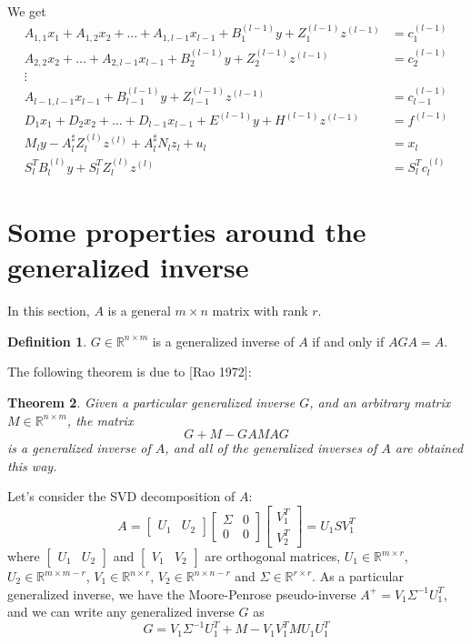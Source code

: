 \documentclass[]{article}
\newtheorem{theorem}{Theorem}[section]
\theoremstyle{definition}
\newtheorem{definition}[theorem]{Definition}
\newcommand{\BIN}{\begin{bmatrix}}
\newcommand{\BOUT}{\end{bmatrix}}
\begin{document}
We get
\begin{align}
A_{1,1} x_1 + A_{1,2} x_2 + \ldots + A_{1,l-1} x_{l-1} + B_1^{(l-1)} y + Z_1^{(l-1)} z^{(l-1)}&= c_1^{(l-1)}  \label{eq:triang_1f}\\
A_{2,2} x_2 + \ldots + A_{2,l-1} x_{l-1} + B_2^{(l-1)} y + Z_2^{(l-1)} z^{(l-1)}&= c_2^{(l-1)}\\
\vdots& \nonumber\\
A_{l-1,l-1} x_{l-1} + B_{l-1}^{(l-1)} y + Z_{l-1}^{(l-1)} z^{(l-1)}&= c_{l-1}^{(l-1)}\\
D_1 x_1 + D_2 x_2 + \ldots + D_{l-1} x_{l-1} + E^{(l-1)} y + H^{(l-1)} z^{(l-1)}&= f^{(l-1)} \label{eq:other_s}\\
M_l y -A_l^\sharp Z_l^{(l)} z^{(l)} + A_l^\sharp N_l z_l + u_l &= x_l\\
	S_l^T B_l^{(l)} y + S_l^T Z_l^{(l)} z^{(l)} &= S_l^T c_l^{(l)}
\end{align}

\appendix
\section{Some properties around the generalized inverse}
In this section, $A$ is a general $m \times n$ matrix with rank $r$.

\begin{definition}
  $G \in \mathbb{R}^{n \times m}$ is a generalized inverse of $A$ if and only if $A G A = A$.
\end{definition}
The following theorem is due to [Rao 1972]:
\begin{theorem}
  Given a particular generalized inverse $G$, and an arbitrary matrix $M\in \mathbb{R}^{n \times m}$, the matrix
	\begin{equation}
		G + M - GAMAG
	\end{equation}
	is a generalized inverse of $A$, and all of the generalized inverses of $A$ are obtained this way.
\end{theorem}

Let's consider the SVD decomposition of $A$:
\begin{equation*}
  A = \BIN U_1 & U_2 \BOUT \BIN \Sigma & 0 \\ 0 & 0 \BOUT \BIN V_1^T \\ V_2^T \BOUT = U_1 S V_1^T
\end{equation*}
where $\BIN U_1 & U_2 \BOUT$ and $\BIN V_1 & V_2 \BOUT$ are orthogonal matrices, $U_1 \in \mathbb{R}^{m \times r}$, $U_2 \in \mathbb{R}^{m \times m-r}$, $V_1 \in \mathbb{R}^{n \times r}$, $V_2 \in \mathbb{R}^{n \times n-r}$ and $\Sigma \in \mathbb{R}^{r \times r}$. As a particular generalized inverse, we have the Moore-Penrose pseudo-inverse $A^+ = V_1 \Sigma^{-1} U_1^T$, and we can write any generalized inverse $G$ as
\begin{equation}
  G = V_1 \Sigma^{-1} U_1^T + M - V_1 V_1^T M U_1 U_1^T \label{eq:generalFormulation}
\end{equation}
\end{document}
